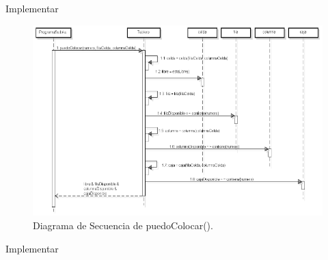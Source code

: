 \documentclass[titlepage,a4paper]{article}
\begin{document}
Implementar

\begin{figure}[H]
\centering
\includegraphics[width=\textwidth]{diagrama_secuencia02.png}
\caption{\label{fig:seq02}Diagrama de Secuencia de puedoColocar().}
\end{figure}

Implementar
\end{document}
